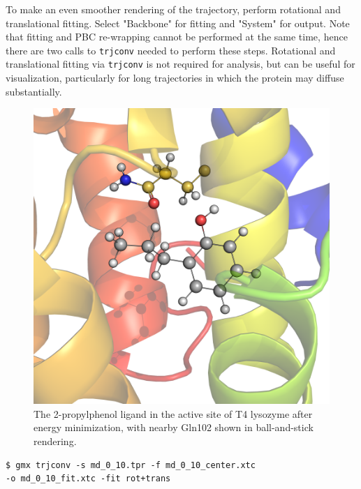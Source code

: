 \documentclass[9pt,tutorial]{livecoms}
\begin{document}
To make an even smoother rendering of the trajectory, perform rotational and translational fitting. Select "Backbone" for fitting and "System" for output. Note that fitting and PBC re-wrapping cannot be performed at the same time, hence there are two calls to \texttt{trjconv} needed to perform these steps. Rotational and translational fitting via \texttt{trjconv} is not required for analysis, but can be useful for visualization, particularly for long trajectories in which the protein may diffuse substantially.

\begin{figure}[ht!]
\centering
\includegraphics{3htb_jz4_zoom}
\caption{The 2-propylphenol ligand in the active site of T4 lysozyme after energy minimization, with nearby Gln102 shown in ball-and-stick rendering.}
\label{3htb_jz4_zoom_fig}
\end{figure}

\begin{verbatim}
$ gmx trjconv -s md_0_10.tpr -f md_0_10_center.xtc
-o md_0_10_fit.xtc -fit rot+trans
\end{verbatim}
\end{document}
